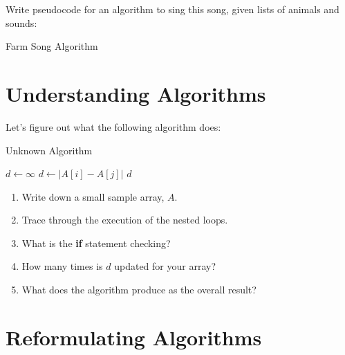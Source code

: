 \documentclass[12pt]{article}
\begin{document}
Write pseudocode for an algorithm to sing this song, given lists of animals and sounds:

\begin{algorithm}
    \caption{Farm Song Algorithm}
    \label{alg:farmsong}
    \begin{algorithmic}


        \EndProcedure
    \end{algorithmic}
\end{algorithm}


\clearpage
\section{Understanding Algorithms}

Let's figure out what the following algorithm does:

\begin{algorithm}
    \caption{Unknown Algorithm}
    \label{alg:unknown}
    \begin{algorithmic}
        \State $d \gets \infty$
                    \State $d \gets |A[i] - A[j]|$
                \EndIf
            \EndFor
        \EndFor
        \State \Return $d$
        \EndProcedure
    \end{algorithmic}
\end{algorithm}

\begin{enumerate}
    \item Write down a small sample array, $A$.
    \item Trace through the execution of the nested loops.
    \item What is the \textbf{if} statement checking? 
    \item How many times is $d$ updated for your array?
    \item What does the algorithm produce as the overall result?
\end{enumerate}


\clearpage
\section{Reformulating Algorithms}
\end{document}
